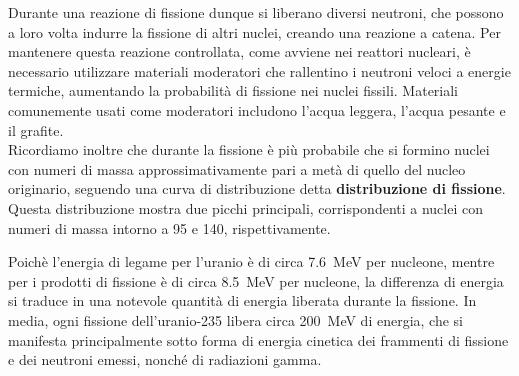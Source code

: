 Durante una reazione di fissione dunque si liberano diversi neutroni, che possono a loro volta indurre la fissione di altri nuclei, creando una reazione a catena. Per mantenere questa reazione controllata, come avviene nei reattori nucleari, è necessario utilizzare materiali moderatori che rallentino i neutroni veloci a energie termiche, aumentando la probabilità di fissione nei nuclei fissili. Materiali comunemente usati come moderatori includono l'acqua leggera, l'acqua pesante e il grafite.\\
Ricordiamo inoltre che durante la fissione è più probabile che si formino nuclei con numeri di massa approssimativamente pari a metà di quello del nucleo originario, seguendo una curva di distribuzione detta \textbf{distribuzione di fissione}. Questa distribuzione mostra due picchi principali, corrispondenti a nuclei con numeri di massa intorno a 95 e 140, rispettivamente.


Poichè l'energia di legame per l'uranio è di circa \qty{7.6}{\mega\electronvolt} per nucleone, mentre per i prodotti di fissione è di circa \qty{8.5}{\mega\electronvolt} per nucleone, la differenza di energia si traduce in una notevole quantità di energia liberata durante la fissione. In media, ogni fissione dell'uranio-235 libera circa \qty{200}{\mega\electronvolt} di energia, che si manifesta principalmente sotto forma di energia cinetica dei frammenti di fissione e dei neutroni emessi, nonché di radiazioni gamma.

